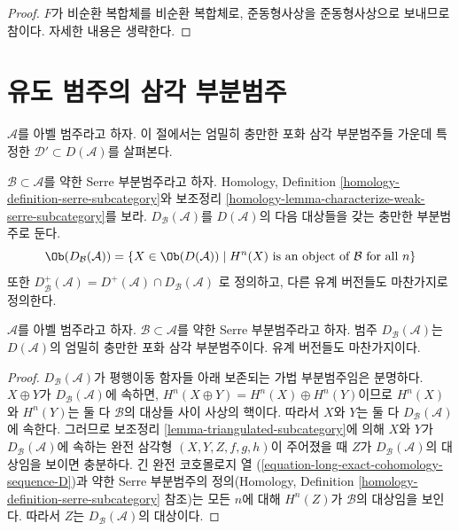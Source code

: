 \begin{proof}
$F$가 비순환 복합체를 비순환 복합체로, 준동형사상을 준동형사상으로
보내므로 참이다. 자세한 내용은 생략한다.
\end{proof}









\section{유도 범주의 삼각 부분범주}
\label{section-triangulated-sub}

\noindent
$\mathcal{A}$를 아벨 범주라고 하자. 이 절에서는 엄밀히 충만한 포화
삼각 부분범주들 가운데 특정한
$\mathcal{D}' \subset D(\mathcal{A})$를 살펴본다.

\medskip\noindent
$\mathcal{B} \subset \mathcal{A}$를 약한 Serre 부분범주라고 하자.
Homology, Definition \ref{homology-definition-serre-subcategory}와 보조정리
\ref{homology-lemma-characterize-weak-serre-subcategory}를 보라.
$D_\mathcal{B}(\mathcal{A})$를 $D(\mathcal{A})$의 다음 대상들을 갖는
충만한 부분범주로 둔다.
$$
\Ob(D_\mathcal{B}(\mathcal{A}))
=
\{X \in \Ob(D(\mathcal{A})) \mid
H^n(X) \text{ is an object of }\mathcal{B}\text{ for all }n\}
$$
또한
$D^{+}_\mathcal{B}(\mathcal{A}) =
D^{+}(\mathcal{A}) \cap D_\mathcal{B}(\mathcal{A})$
로 정의하고, 다른 유계 버전들도 마찬가지로 정의한다.

\begin{lemma}
\label{lemma-cohomology-in-serre-subcategory}
$\mathcal{A}$를 아벨 범주라고 하자.
$\mathcal{B} \subset \mathcal{A}$를 약한 Serre 부분범주라고 하자.
범주 $D_\mathcal{B}(\mathcal{A})$는 $D(\mathcal{A})$의 엄밀히 충만한
포화 삼각 부분범주이다. 유계 버전들도 마찬가지이다.
\end{lemma}

\begin{proof}
$D_\mathcal{B}(\mathcal{A})$가 평행이동 함자들 아래 보존되는 가법
부분범주임은 분명하다. $X \oplus Y$가 $D_\mathcal{B}(\mathcal{A})$에
속하면, $H^n(X \oplus Y) = H^n(X) \oplus H^n(Y)$이므로
$H^n(X)$와 $H^n(Y)$는 둘 다 $\mathcal{B}$의 대상들 사이 사상의 핵이다.
따라서 $X$와 $Y$는 둘 다 $D_\mathcal{B}(\mathcal{A})$에 속한다.
그러므로 보조정리 \ref{lemma-triangulated-subcategory}에 의해
$X$와 $Y$가 $D_\mathcal{B}(\mathcal{A})$에 속하는 완전 삼각형
$(X, Y, Z, f, g, h)$이 주어졌을 때 $Z$가
$D_\mathcal{B}(\mathcal{A})$의 대상임을 보이면 충분하다.
긴 완전 코호몰로지 열
(\ref{equation-long-exact-cohomology-sequence-D})과 약한 Serre 부분범주의
정의(Homology, Definition \ref{homology-definition-serre-subcategory} 참조)는
모든 $n$에 대해 $H^n(Z)$가 $\mathcal{B}$의 대상임을 보인다.
따라서 $Z$는 $D_\mathcal{B}(\mathcal{A})$의 대상이다.
\end{proof}

